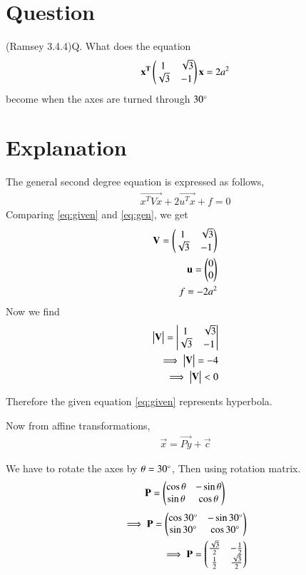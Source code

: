 \documentclass[journal,12pt,twocolumn]{IEEEtran}
\begin{document}
\section{\textbf{Question}}
(Ramsey 3.4.4)Q. What does the equation
\begin{align}
    \mathbf{x^T}\begin{pmatrix} 1 & \sqrt{3} \\ \sqrt{3} & -1 \end{pmatrix}\mathbf{x}=2a^2\label{eq:given}
\end{align}
become when the axes are turned through $30\degree$
\section{\textbf{Explanation}}
The general second degree equation is expressed as follows,
\begin{align}
    \vec{x^TVx}+2\vec{u^Tx}+f=0\label{eq:gen}
\end{align}
Comparing \eqref{eq:given} and \eqref{eq:gen}, we get
\begin{align}
    \mathbf{V}=\begin{pmatrix} 1 & \sqrt{3} \\ \sqrt{3} & -1 \end{pmatrix}\label{eq:V}\\
    \mathbf{u}=\begin{pmatrix}0 \\ 0\end{pmatrix}\label{eq:u}\\
    f=-2a^2\label{eq:f}
\end{align}
Now we find
\begin{align}
    \begin{vmatrix}\mathbf{V}\end{vmatrix}=\begin{vmatrix}1 & \sqrt{3} \\ \sqrt{3} & -1\end{vmatrix}\\
    \implies\begin{vmatrix}\mathbf{V}\end{vmatrix}=-4\\
    \implies\begin{vmatrix}\mathbf{V}\end{vmatrix}<0
\end{align}

Therefore the given equation \eqref{eq:given} represents  hyperbola.

Now from affine transformations,
\begin{align}
    \vec{x}=\vec{Py}+\vec{c}
\end{align}

We have to rotate the axes by $\theta=30\degree$, Then using rotation matrix.
\begin{align}
    \mathbf{P}=\begin{pmatrix}\cos\theta & -\sin\theta \\ \sin\theta & \cos\theta\end{pmatrix}
\end{align}
\begin{align}
    \implies\mathbf{P}=\begin{pmatrix}\cos30\degree & -\sin30\degree \\ \sin30\degree & \cos30\degree\end{pmatrix}\\
    \implies\mathbf{P}=\begin{pmatrix}\frac{\sqrt{3}}{2} & -\frac{1}{2} \\ \frac{1}{2} & \frac{\sqrt{3}}{2}\end{pmatrix}\label{eq:P}
\end{align}
\end{document}
